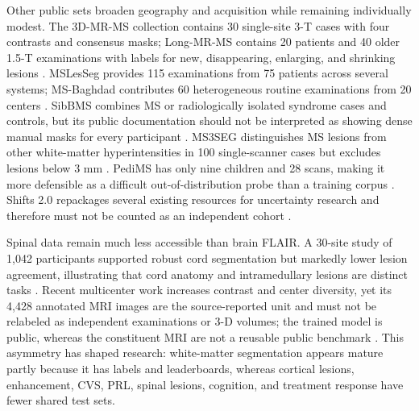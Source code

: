 \documentclass[journal,twoside,web]{ieeecolor}
\begin{document}
Other public sets broaden geography and acquisition while remaining individually modest. The 3D-MR-MS collection contains 30 single-site 3-T cases with four contrasts and consensus masks; Long-MR-MS contains 20 patients and 40 older 1.5-T examinations with labels for new, disappearing, enlarging, and shrinking lesions \cite{lesjak3d,lesjaklong}. MSLesSeg provides 115 examinations from 75 patients across several systems; MS-Baghdad contributes 60 heterogeneous routine examinations from 20 centers \cite{mslesseg,msbaghdad}. SibBMS combines MS or radiologically isolated syndrome cases and controls, but its public documentation should not be interpreted as showing dense manual masks for every participant \cite{sibbms}. MS3SEG distinguishes MS lesions from other white-matter hyperintensities in 100 single-scanner cases but excludes lesions below 3 mm \cite{ms3seg}. PediMS has only nine children and 28 scans, making it more defensible as a difficult out-of-distribution probe than a training corpus \cite{pedims}. Shifts 2.0 repackages several existing resources for uncertainty research and therefore must not be counted as an independent cohort \cite{shifts2}.


Spinal data remain much less accessible than brain FLAIR. A 30-site study of 1,042 participants supported robust cord segmentation but markedly lower lesion agreement, illustrating that cord anatomy and intramedullary lesions are distinct tasks \cite{gros2019}. Recent multicenter work increases contrast and center diversity, yet its 4,428 annotated MRI images are the source-reported unit and must not be relabeled as independent examinations or 3-D volumes; the trained model is public, whereas the constituent MRI are not a reusable public benchmark \cite{benveniste}. This asymmetry has shaped research: white-matter segmentation appears mature partly because it has labels and leaderboards, whereas cortical lesions, enhancement, CVS, PRL, spinal lesions, cognition, and treatment response have fewer shared test sets.
\end{document}

